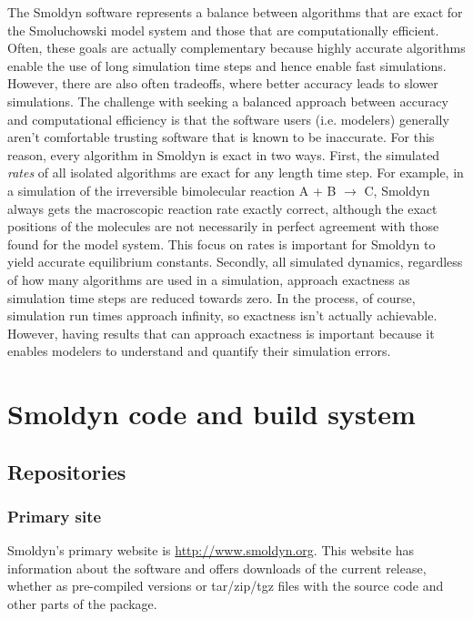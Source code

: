 \documentclass {book}
\begin{document}
The Smoldyn software represents a balance between algorithms that are exact for the Smoluchowski model system and those that are computationally efficient. Often, these goals are actually complementary because highly accurate algorithms enable the use of long simulation time steps and hence enable fast simulations. However, there are also often tradeoffs, where better accuracy leads to slower simulations. The challenge with seeking a balanced approach between accuracy and computational efficiency is that the software users (i.e. modelers) generally aren't comfortable trusting software that is known to be inaccurate. For this reason, every algorithm in Smoldyn is exact in two ways. First, the simulated \emph{rates} of all isolated algorithms are exact for any length time step. For example, in a simulation of the irreversible bimolecular reaction A + B $\rightarrow$ C, Smoldyn always gets the macroscopic reaction rate exactly correct, although the exact positions of the molecules are not necessarily in perfect agreement with those found for the model system. This focus on rates is important for Smoldyn to yield accurate equilibrium constants. Secondly, all simulated dynamics, regardless of how many algorithms are used in a simulation, approach exactness as simulation time steps are reduced towards zero. In the process, of course, simulation run times approach infinity, so exactness isn't actually achievable. However, having results that can approach exactness is important because it enables modelers to understand and quantify their simulation errors.


\chapter{Smoldyn code and build system}

\section{Repositories}

\subsection{Primary site}

Smoldyn's primary website is \url{http://www.smoldyn.org}. This website has information about the software and offers downloads of the current release, whether as pre-compiled versions or tar/zip/tgz files with the source code and other parts of the package.
\end{document}

